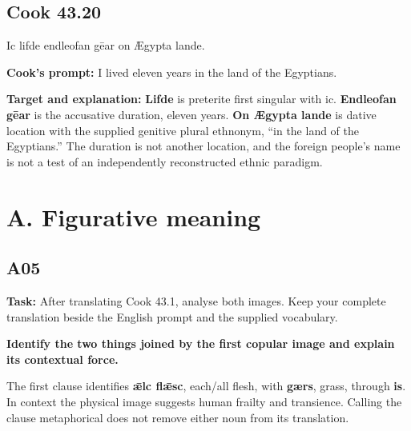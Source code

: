 \par\begin{minipage}{\linewidth}\raggedright
\subsection*{Cook 43.20}

Ic lifde endleofan gēar on Ægypta lande.

\textbf{Cook's prompt:} I lived eleven years in the land of the Egyptians.

\textbf{Target and explanation:} \textbf{Lifde} is preterite first singular with ic. \textbf{Endleofan gēar} is the accusative duration, eleven years. \textbf{On Ægypta lande} is dative location with the supplied genitive plural ethnonym, “in the land of the Egyptians.” The duration is not another location, and the foreign people's name is not a test of an independently reconstructed ethnic paradigm.

\end{minipage}\par\addvspace{4pt}

\section*{A. Figurative meaning}

\subsection*{A05}

\textbf{Task:} After translating Cook 43.1, analyse both images. Keep your complete translation beside the English prompt and the supplied vocabulary.

\textbf{Identify the two things joined by the first copular image and explain its contextual force.}

The first clause identifies \textbf{ǣlc flǣsc}, each/\allowbreak{}all flesh, with \textbf{gærs}, grass, through \textbf{is}. In context the physical image suggests human frailty and transience. Calling the clause metaphorical does not remove either noun from its translation.


